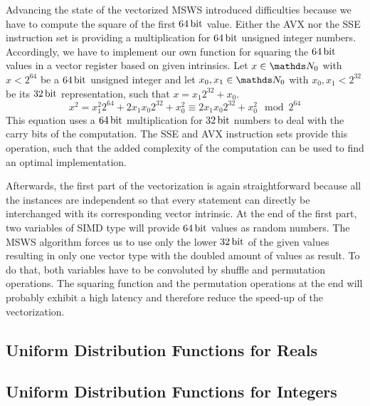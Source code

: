 \documentclass{stdlocal}
\begin{document}
    Advancing the state of the vectorized MSWS introduced difficulties because we have to compute the square of the first $64\, \mathrm{bit}$ value.
    Either the AVX nor the SSE instruction set is providing a multiplication for $64\, \mathrm{bit}$ unsigned integer numbers.
    Accordingly, we have to implement our own function for squaring the $64\, \mathrm{bit}$ values in a vector register based on given intrinsics.
    Let $x\in\setNatural_0$ with $x < 2^{64}$ be a $64\, \mathrm{bit}$ unsigned integer and let $x_0,x_1\in\setNatural_0$ with $x_0,x_1 < 2^{32}$ be its $32\, \mathrm{bit}$ representation, such that $x = x_1 2^{32} + x_0$.
    \[
      x^2 = x_1^2 2^{64} + 2x_1x_0 2^{32} + x_0^2 \equiv 2x_1x_0 2^{32} + x_0^2 \mod 2^{64}
    \]
    This equation uses a $64\, \mathrm{bit}$ multiplication for $32\, \mathrm{bit}$ numbers to deal with the carry bits of the computation.
    The SSE and AVX instruction sets provide this operation, such that the added complexity of the computation can be used to find an optimal implementation.

    Afterwards, the first part of the vectorization is again straightforward because all the instances are independent so that every statement can directly be interchanged with its corresponding vector intrinsic.
    At the end of the first part, two variables of SIMD type will provide $64\, \mathrm{bit}$ values as random numbers.
    The MSWS algorithm forces us to use only the lower $32\, \mathrm{bit}$ of the given values resulting in only one vector type with the doubled amount of values as result.
    To do that, both variables have to be convoluted by shuffle and permutation operations.
    The squaring function and the permutation operations at the end will probably exhibit a high latency and therefore reduce the speed-up of the vectorization.



  \subsection{Uniform Distribution Functions for Reals} %
  \label{sub:uniform_real_distribution}

  \subsection{Uniform Distribution Functions for Integers} %
  \label{sub:uniform_distribution_functions_for_integers}

\end{document}
